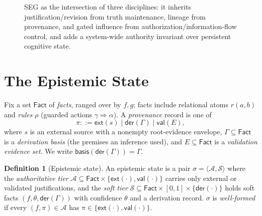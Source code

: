 \documentclass[11pt]{article}
\theoremstyle{plain}
\theoremstyle{definition}
\newtheorem{definition}[theorem]{Definition}
\newcommand{\Aut}{\mathcal{A}}
\newcommand{\Soft}{\mathcal{S}}
\newcommand{\St}{\sigma}
\newcommand{\ext}{\mathsf{ext}}
\newcommand{\der}{\mathsf{der}}
\newcommand{\val}{\mathsf{val}}
\newcommand{\basis}{\mathsf{basis}}
\newcommand{\Facts}{\mathsf{Fact}}
\newcommand{\confff}{\theta}
\begin{document}
\begin{figure}[t]
\centering
{}
\caption{SEG as the intersection of three disciplines: it inherits
justification/revision from truth maintenance, lineage from provenance, and gated
influence from authorization/information-flow control, and adds a system-wide
authority invariant over persistent cognitive state.}
\label{fig:map}
\end{figure}

\section{The Epistemic State}
\label{sec:state}

Fix a set $\Facts$ of \emph{facts}, ranged over by $f,g$; facts include
relational atoms $r(a,b)$ and \emph{rules} $\rho$ (guarded actions
$\gamma \Rightarrow \alpha$). A \emph{provenance} record is one of
\[
  \pi ::= \ext(s) \mid \der(\Gamma) \mid \val(E),
\]
where $s$ is an external source with a nonempty root-evidence envelope,
$\Gamma \subseteq \Facts$ is a \emph{derivation basis} (the premises an inference
used), and $E \subseteq \Facts$ is a \emph{validation evidence set}. We write
$\basis(\der(\Gamma)) = \Gamma$.

\begin{definition}[Epistemic state]
An epistemic state is a pair $\St = \langle \Aut, \Soft\rangle$ where the
\emph{authoritative tier} $\Aut \subseteq \Facts \times \{\ext(\cdot),
\val(\cdot)\}$ carries only external or validated justifications, and the
\emph{soft tier} $\Soft \subseteq \Facts \times [0,1] \times \{\der(\cdot)\}$
holds soft facts $(f,\confff,\der(\Gamma))$ with confidence $\confff$ and a
derivation record. $\St$ is \emph{well-formed} if every $(f,\pi)\in\Aut$ has
$\pi\in\{\ext(\cdot),\val(\cdot)\}$.
\end{definition}
\end{document}
